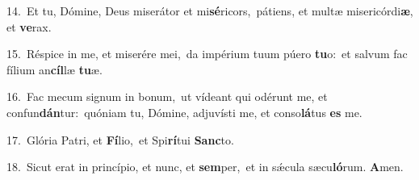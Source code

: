 {\numbfont\textcolor{\numbcolor}{14.}}~Et tu, Dómine, Deus miserátor et mi\-\textbf{sé}\-ricors,~\star pátiens, et multæ misericórdi\-\textbf{æ}\-, et \textbf{ve}\-rax.\par
{\numbfont\textcolor{\numbcolor}{15.}}~Réspice in me, et miserére mei,~\dagger da impérium tuum púero \textbf{tu}\-o:~\star et salvum fac fílium an\-\textbf{cíl}\-læ \textbf{tu}\-æ.\par
{\numbfont\textcolor{\numbcolor}{16.}}~Fac mecum signum in bonum,~\dagger ut vídeant qui odérunt me, et confun\-\textbf{dán}\-tur:~\star quóniam tu, Dómine, adjuvísti me, et conso\-\textbf{lá}\-tus \textbf{es} me.\par
{\numbfont\textcolor{\numbcolor}{17.}}~Glória Patri, et \textbf{Fí}\-lio,~\star et Spi\-\textbf{rí}\-tui \textbf{Sanc}\-to.\par
{\numbfont\textcolor{\numbcolor}{18.}}~Sicut erat in princípio, et nunc, et \textbf{sem}\-per,~\star et in sǽcula sæcu\-\textbf{ló}\-rum. \textbf{A}\-men.\par

